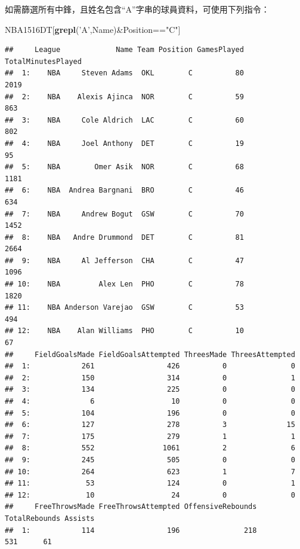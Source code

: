 \documentclass[]{book}
\newenvironment{Shaded}{\begin{snugshade}}{\end{snugshade}}
\newcommand{\KeywordTok}[1]{\textcolor[rgb]{0.13,0.29,0.53}{\textbf{{#1}}}}
\newcommand{\StringTok}[1]{\textcolor[rgb]{0.31,0.60,0.02}{{#1}}}
\newcommand{\NormalTok}[1]{{#1}}
\theoremstyle{definition}
\theoremstyle{definition}
\theoremstyle{remark}
\begin{document}
如需篩選所有中鋒，且姓名包含``A''字串的球員資料，可使用下列指令：

\begin{Shaded}
\begin{Highlighting}[]
\NormalTok{NBA1516DT[}\KeywordTok{grepl}\NormalTok{(}\StringTok{'A'}\NormalTok{,Name)&Position==}\StringTok{"C"}\NormalTok{]}
\end{Highlighting}
\end{Shaded}

\begin{verbatim}
##     League             Name Team Position GamesPlayed TotalMinutesPlayed
##  1:    NBA     Steven Adams  OKL        C          80               2019
##  2:    NBA    Alexis Ajinca  NOR        C          59                863
##  3:    NBA     Cole Aldrich  LAC        C          60                802
##  4:    NBA     Joel Anthony  DET        C          19                 95
##  5:    NBA        Omer Asik  NOR        C          68               1181
##  6:    NBA  Andrea Bargnani  BRO        C          46                634
##  7:    NBA     Andrew Bogut  GSW        C          70               1452
##  8:    NBA   Andre Drummond  DET        C          81               2664
##  9:    NBA     Al Jefferson  CHA        C          47               1096
## 10:    NBA         Alex Len  PHO        C          78               1820
## 11:    NBA Anderson Varejao  GSW        C          53                494
## 12:    NBA    Alan Williams  PHO        C          10                 67
##     FieldGoalsMade FieldGoalsAttempted ThreesMade ThreesAttempted
##  1:            261                 426          0               0
##  2:            150                 314          0               1
##  3:            134                 225          0               0
##  4:              6                  10          0               0
##  5:            104                 196          0               0
##  6:            127                 278          3              15
##  7:            175                 279          1               1
##  8:            552                1061          2               6
##  9:            245                 505          0               0
## 10:            264                 623          1               7
## 11:             53                 124          0               1
## 12:             10                  24          0               0
##     FreeThrowsMade FreeThrowsAttempted OffensiveRebounds TotalRebounds Assists
##  1:            114                 196               218           531      61

\end{verbatim}
\end{document}

